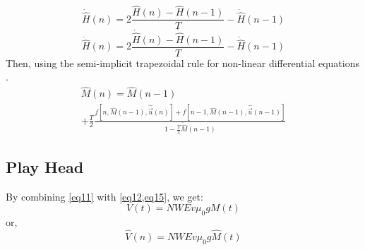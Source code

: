 \documentclass[twoside,a4paper]{article}
\begin{document}
\begin{equation}
    \dot{\hat{H}}(n) = 2 \frac{\hat{H}(n) - \hat{H}(n-1)}{T} - \dot{\hat{H}}(n-1)
\end{equation}
\begin{equation}
    \ddot{\hat{H}}(n) = 2 \frac{\dot{\hat{H}}(n) - \dot{\hat{H}}(n-1)}{T} - \ddot{\hat{H}}(n-1)
\end{equation}
%
Then, using the semi-implicit trapezoidal rule for non-linear differential
equations \cite{Yeh}.
\begin{multline}
    \hat{M}(n) = \hat{M}(n-1)\\
     + \frac{T}{2} \frac{f[n, \hat{M}(n-1), \hat{\vec{u}}(n)] + f[n-1, \hat{M}(n-1), \hat{\vec{u}}(n-1)]}{1 - \frac{T}{2}\ddot{\hat{M}}(n-1)}
\end{multline}

\subsection{Play Head}
By combining \cref{eq11} with \cref{eq12,eq15}, we get:
\begin{equation}
    V(t) =  NWEv \mu_0  g M(t)
\end{equation}
%
or,
\begin{equation}
    \hat{V}(n) =  NWEv \mu_0  g \hat{M}(t)
\end{equation}
%

\nocite{*}


\end{document}
